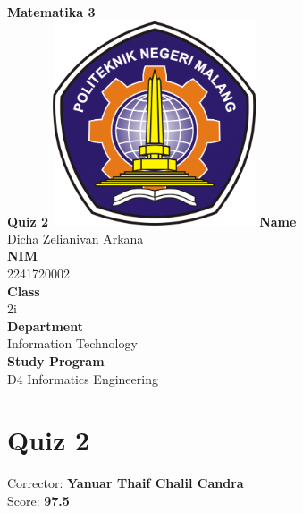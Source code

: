\documentclass[12pt,titlepage]{article}
\newcommand{\vSubject}{Matematika 3}
\newcommand{\vSubtitle}{Quiz 2}
\newcommand{\vName}{Dicha Zelianivan Arkana}
\newcommand{\vNIM}{2241720002}
\newcommand{\vClass}{2i}
\newcommand{\vDepartment}{Information Technology}
\newcommand{\vStudyProgram}{D4 Informatics Engineering}
\begin{document}
\begin{titlepage}
    \centering
    \vfill
    {\bfseries\LARGE
        \vSubject\\
        \vskip0.25cm
        \vSubtitle
    }
    \vfill
    \includegraphics[width=6cm]{images/polinema-logo.png}
    \vfill
    {
        \textbf{Name}\\
        \vName\\
        \vskip0.5cm
        \textbf{NIM}\\
        \vNIM\\
        \vskip0.5cm
        \textbf{Class}\\
        \vClass\\
        \vskip0.5cm
        \textbf{Department}\\
        \vDepartment\\
        \vskip0.5cm
        \textbf{Study Program}\\
        \vStudyProgram
    }
\end{titlepage}

\section*{Quiz 2}

Corrector: \textbf{Yanuar Thaif Chalil Candra}\\
Score: \textbf{97.5}
\end{document}
